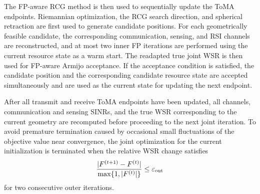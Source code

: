 \documentclass[letterpaper,journal]{IEEEtran}
\begin{document}
The FP-aware RCG method is then used to sequentially update the ToMA endpoints. Riemannian optimization, the RCG search direction, and spherical retraction are first used to generate candidate positions. For each geometrically feasible candidate, the corresponding communication, sensing, and RSI channels are reconstructed, and at most two inner FP iterations are performed using the current resource state as a warm start. The readapted true joint WSR is then used for FP-aware Armijo acceptance. If the acceptance condition is satisfied, the candidate position and the corresponding candidate resource state are accepted simultaneously and are used as the current state for updating the next endpoint.

After all transmit and receive ToMA endpoints have been updated, all channels, communication and sensing SINRs, and the true WSR corresponding to the current geometry are recomputed before proceeding to the next joint iteration. To avoid premature termination caused by occasional small fluctuations of the objective value near convergence, the joint optimization for the current initialization is terminated when the relative WSR change satisfies
\begin{equation}
\frac{
|F^{(t+1)}-F^{(t)}|
}{
\max\{1,|F^{(t)}|\}
}
\le
\varepsilon_{\rm out}
\label{eq:outer_stop}
\end{equation}
for two consecutive outer iterations.
% 
% 
\end{document}
